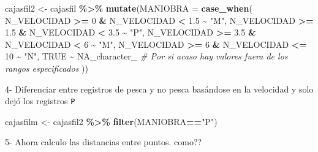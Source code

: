 \documentclass[
]{article}
\newenvironment{Shaded}{\begin{snugshade}}{\end{snugshade}}
\newcommand{\AttributeTok}[1]{\textcolor[rgb]{0.13,0.29,0.53}{#1}}
\newcommand{\CommentTok}[1]{\textcolor[rgb]{0.56,0.35,0.01}{\textit{#1}}}
\newcommand{\ConstantTok}[1]{\textcolor[rgb]{0.56,0.35,0.01}{#1}}
\newcommand{\DecValTok}[1]{\textcolor[rgb]{0.00,0.00,0.81}{#1}}
\newcommand{\FloatTok}[1]{\textcolor[rgb]{0.00,0.00,0.81}{#1}}
\newcommand{\FunctionTok}[1]{\textcolor[rgb]{0.13,0.29,0.53}{\textbf{#1}}}
\newcommand{\NormalTok}[1]{#1}
\newcommand{\OtherTok}[1]{\textcolor[rgb]{0.56,0.35,0.01}{#1}}
\newcommand{\SpecialCharTok}[1]{\textcolor[rgb]{0.81,0.36,0.00}{\textbf{#1}}}
\newcommand{\StringTok}[1]{\textcolor[rgb]{0.31,0.60,0.02}{#1}}
\begin{document}
\begin{Shaded}
\begin{Highlighting}[]
\NormalTok{cajasfil2 }\OtherTok{\textless{}{-}}\NormalTok{ cajasfil }\SpecialCharTok{\%\textgreater{}\%}
  \FunctionTok{mutate}\NormalTok{(}\AttributeTok{MANIOBRA =} \FunctionTok{case\_when}\NormalTok{(}
\NormalTok{    N\_VELOCIDAD }\SpecialCharTok{\textgreater{}=} \DecValTok{0} \SpecialCharTok{\&}\NormalTok{ N\_VELOCIDAD }\SpecialCharTok{\textless{}} \FloatTok{1.5} \SpecialCharTok{\textasciitilde{}} \StringTok{"M"}\NormalTok{,}
\NormalTok{    N\_VELOCIDAD }\SpecialCharTok{\textgreater{}=} \FloatTok{1.5} \SpecialCharTok{\&}\NormalTok{ N\_VELOCIDAD }\SpecialCharTok{\textless{}} \FloatTok{3.5} \SpecialCharTok{\textasciitilde{}} \StringTok{"P"}\NormalTok{,}
\NormalTok{    N\_VELOCIDAD }\SpecialCharTok{\textgreater{}=} \FloatTok{3.5} \SpecialCharTok{\&}\NormalTok{ N\_VELOCIDAD }\SpecialCharTok{\textless{}} \DecValTok{6} \SpecialCharTok{\textasciitilde{}} \StringTok{"M"}\NormalTok{,}
\NormalTok{    N\_VELOCIDAD }\SpecialCharTok{\textgreater{}=} \DecValTok{6} \SpecialCharTok{\&}\NormalTok{ N\_VELOCIDAD }\SpecialCharTok{\textless{}=} \DecValTok{10} \SpecialCharTok{\textasciitilde{}} \StringTok{"N"}\NormalTok{,}
    \ConstantTok{TRUE} \SpecialCharTok{\textasciitilde{}} \ConstantTok{NA\_character\_}  \CommentTok{\# Por si acaso hay valores fuera de los rangos especificados}
\NormalTok{  ))}
\end{Highlighting}
\end{Shaded}

4- Diferenciar entre registros de pesca y no pesca basándose en la velocidad y solo dejó los registros \texttt{P}

\begin{Shaded}
\begin{Highlighting}[]
\NormalTok{cajasfilm }\OtherTok{\textless{}{-}}\NormalTok{ cajasfil2 }\SpecialCharTok{\%\textgreater{}\%} 
  \FunctionTok{filter}\NormalTok{(MANIOBRA}\SpecialCharTok{==}\StringTok{"P"}\NormalTok{)}
\end{Highlighting}
\end{Shaded}

5- Ahora calculo las distancias entre puntos. como??
\end{document}
